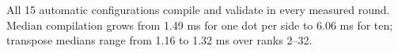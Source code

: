 All 15 automatic configurations compile and validate in every measured round. Median compilation grows from 1.49 ms for one dot per side to 6.06 ms for ten; transpose medians range from 1.16 to 1.32 ms over ranks 2--32.
